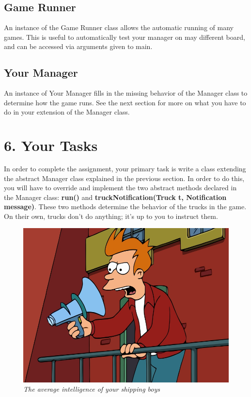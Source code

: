 \documentclass[11pt]{article}
\begin{document}
\subsection{Game Runner}
An instance of the Game Runner class allows the automatic running of many games.
This is useful to automatically test your manager on may different board, and
can be accessed via arguments given to main.
\subsection{Your Manager}
An instance of Your Manager fills in the missing behavior of the Manager class
to determine how the game runs. See the next section for more on what you have
to do in your extension of the Manager class.

\newpage
\section{6. Your Tasks}
In order to complete the assignment, your primary task is write a class
extending the abstract Manager class explained in the previous section. In order
to do this, you will have to override and implement the two abstract methods
declared in the Manager class: \textbf{run()} and
\textbf{truckNotification(Truck t, Notification message)}. These two methods
determine the behavior of the trucks in the game. On their own, trucks don't do
anything; it's up to you to instruct them.\\

\begin{figure}[h]
\centerline{\includegraphics[scale=0.4]{fry.jpg}} 
\caption{\em{The average intelligence of your shipping boys}}
\end{figure}
\end{document}

